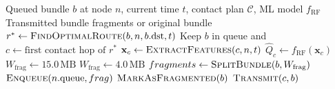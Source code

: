 \documentclass[a4paper,fleqn]{cas-dc}
\newcommand{\mlcgr}{\textsf{ML-CGR}}
\begin{document}
\begin{algorithm}[h]
\caption{\mlcgr{} Proactive Fragmentation and Forwarding}
\label{alg:frag}
\begin{algorithmic}[1]
\REQUIRE Queued bundle $b$ at node $n$, current time $t$, contact plan $\mathcal{C}$, ML model $f_{\text{RF}}$
\ENSURE Transmitted bundle fragments or original bundle
\STATE $r^* \leftarrow \textsc{FindOptimalRoute}(b, n, b.\text{dst}, t)$
    \STATE Keep $b$ in queue and \RETURN
\ENDIF
\STATE $c \leftarrow \text{first contact hop of } r^*$
\STATE $\mathbf{x}_c \leftarrow \textsc{ExtractFeatures}(c, n, t)$
\STATE $\hat{Q}_c \leftarrow f_{\text{RF}}(\mathbf{x}_c)$
        \STATE $W_{\text{frag}} \leftarrow 15.0\,\text{MB}$
    \ELSE
        \STATE $W_{\text{frag}} \leftarrow 4.0\,\text{MB}$
    \ENDIF
    \STATE $fragments \leftarrow \textsc{SplitBundle}(b, W_{\text{frag}})$
        \STATE $\textsc{Enqueue}(n.\text{queue}, frag)$
    \ENDFOR
    \STATE $\textsc{MarkAsFragmented}(b)$
\ELSE
    \STATE $\textsc{Transmit}(c, b)$
\ENDIF
\end{algorithmic}
\end{algorithm}
\end{document}
